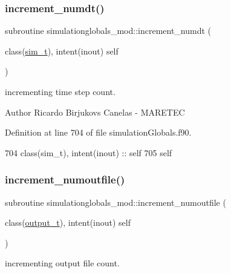 \subsubsection{\texorpdfstring{increment\+\_\+numdt()}{increment\_numdt()}}
{\footnotesize\ttfamily subroutine simulationglobals\+\_\+mod\+::increment\+\_\+numdt (\begin{DoxyParamCaption}\item[{class(\mbox{\hyperlink{structsimulationglobals__mod_1_1sim__t}{sim\+\_\+t}}), intent(inout)}]{self }\end{DoxyParamCaption})\hspace{0.3cm}{\ttfamily [private]}}



incrementing time step count. 

\begin{DoxyAuthor}{Author}
Ricardo Birjukovs Canelas -\/ M\+A\+R\+E\+T\+EC 
\end{DoxyAuthor}


Definition at line 704 of file simulation\+Globals.\+f90.


\begin{DoxyCode}
704     \textcolor{keywordtype}{class}(sim\_t), \textcolor{keywordtype}{intent(inout)} :: self
705     self%
\end{DoxyCode}
\mbox{\label{namespacesimulationglobals__mod_a77d7175bc03e472ee9a00ee9f6ff1b0e}} 
\subsubsection{\texorpdfstring{increment\+\_\+numoutfile()}{increment\_numoutfile()}}
{\footnotesize\ttfamily subroutine simulationglobals\+\_\+mod\+::increment\+\_\+numoutfile (\begin{DoxyParamCaption}\item[{class(\mbox{\hyperlink{structsimulationglobals__mod_1_1output__t}{output\+\_\+t}}), intent(inout)}]{self }\end{DoxyParamCaption})\hspace{0.3cm}{\ttfamily [private]}}



incrementing output file count. 

